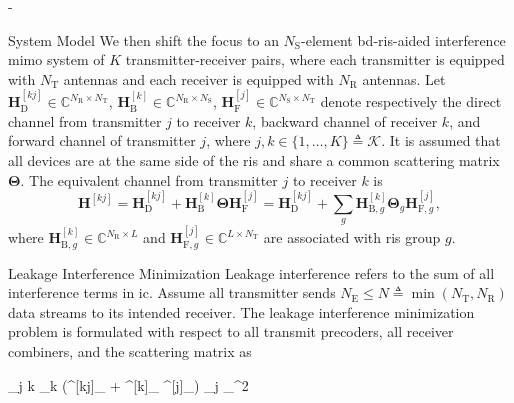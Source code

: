 \begin{section}{-}
	\begin{subsection}{System Model}
		We then shift the focus to an $N_\mathrm{S}$-element \gls{bd}-\gls{ris}-aided interference \gls{mimo} system of $K$ transmitter-receiver pairs, where each transmitter is equipped with $N_\mathrm{T}$ antennas and each receiver is equipped with $N_\mathrm{R}$ antennas.
		Let $\mathbf{H}_\mathrm{D}^{[kj]} \in \mathbb{C}^{N_\mathrm{R} \times N_\mathrm{T}}$, $\mathbf{H}_\mathrm{B}^{[k]} \in \mathbb{C}^{N_\mathrm{R} \times N_\mathrm{S}}$, $\mathbf{H}_\mathrm{F}^{[j]} \in \mathbb{C}^{N_\mathrm{S} \times N_\mathrm{T}}$ denote respectively the direct channel from transmitter $j$ to receiver $k$, backward channel of receiver $k$, and forward channel of transmitter $j$, where $j, k \in \{1,\ldots,K\} \triangleq \mathcal{K}$.
		It is assumed that all devices are at the same side of the \gls{ris} and share a common scattering matrix $\mathbf{\Theta}$.
		The equivalent channel from transmitter $j$ to receiver $k$ is
		\begin{equation}
			\mathbf{H}^{[kj]} = \mathbf{H}_\mathrm{D}^{[kj]} + \mathbf{H}_\mathrm{B}^{[k]} \mathbf{\Theta} \mathbf{H}_\mathrm{F}^{[j]} = \mathbf{H}_\mathrm{D}^{[kj]} + \sum_g \mathbf{H}_{\mathrm{B},g}^{[k]} \mathbf{\Theta}_g \mathbf{H}_{\mathrm{F},g}^{[j]},
			\label{eq:channel_equivalent_ic}
		\end{equation}
		where $\mathbf{H}_{\mathrm{B},g}^{[k]} \in \mathbb{C}^{N_\mathrm{R} \times L}$ and $\mathbf{H}_{\mathrm{F},g}^{[j]} \in \mathbb{C}^{L \times N_\mathrm{T}}$ are associated with \gls{ris} group $g$.
	\end{subsection}
	\begin{subsection}{Leakage Interference Minimization}
		Leakage interference refers to the sum of all interference terms in \gls{ic}.
		Assume all transmitter sends $N_\mathrm{E} \le N \triangleq \min(N_\mathrm{T}, N_\mathrm{R})$ data streams to its intended receiver.
		The leakage interference minimization problem is formulated with respect to all transmit precoders, all receiver combiners, and the scattering matrix as
		\begin{mini!}
			{}{\mathop{\sum\sum}_{j \neq k} \left\lVert {}_k (^{[kj]}_ + ^{[k]}_ \mathbf{\Theta} ^{[j]}_{}) _j \right\rVert _{}^2}{\label{op:leakage}}{}

\end{mini!}
\end{subsection}
\end{section}
